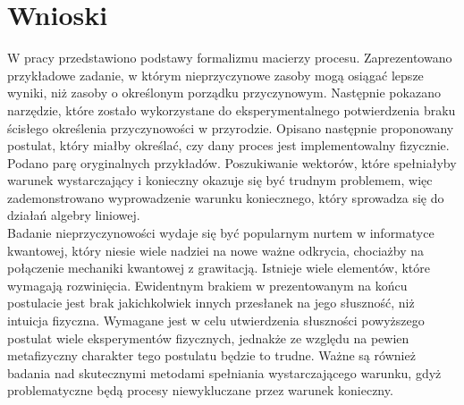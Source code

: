 \documentclass[10pt]{article} %
\begin{document}
\section{Wnioski}
W pracy przedstawiono podstawy formalizmu macierzy procesu. Zaprezentowano przykładowe zadanie, w którym nieprzyczynowe zasoby mogą osiągać lepsze wyniki, niż zasoby o określonym porządku przyczynowym. Następnie pokazano narzędzie, które zostało wykorzystane do eksperymentalnego potwierdzenia
braku ścisłego określenia przyczynowości w przyrodzie. Opisano następnie proponowany postulat, który miałby określać, czy dany proces jest implementowalny fizycznie. Podano parę oryginalnych przykładów. Poszukiwanie wektorów, które spełniałyby warunek wystarczający i konieczny okazuje się być trudnym problemem, więc zademonstrowano wyprowadzenie 
warunku koniecznego, który sprowadza się do działań algebry liniowej.\\
Badanie nieprzyczynowości wydaje się być popularnym nurtem w informatyce kwantowej, który niesie wiele nadziei na nowe ważne odkrycia, chociażby na połączenie mechaniki kwantowej z grawitacją. Istnieje wiele elementów, które wymagają rozwinięcia.
Ewidentnym brakiem w prezentowanym na końcu postulacie jest brak jakichkolwiek innych przesłanek na jego słuszność, niż intuicja fizyczna. Wymagane jest w celu utwierdzenia słuszności powyższego postulat wiele eksperymentów fizycznych, jednakże ze względu na pewien metafizyczny charakter tego postulatu będzie to trudne.
Ważne są również badania nad skutecznymi metodami spełniania wystarczającego warunku, gdyż problematyczne będą procesy niewykluczane przez warunek konieczny. 

\renewcommand\appendixname{Dodatek}
\renewcommand\appendixpagename{Dodatek}
\newpage
\tableofcontents
\newpage
\listoffigures
\newpage
\end{document}
